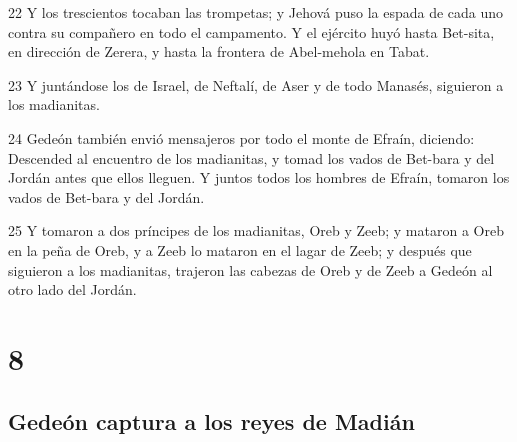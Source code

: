 \par 22 Y los trescientos tocaban las trompetas; y Jehová puso la espada de cada uno contra su compañero en todo el campamento. Y el ejército huyó hasta Bet-sita, en dirección de Zerera, y hasta la frontera de Abel-mehola en Tabat.
\par 23 Y juntándose los de Israel, de Neftalí, de Aser y de todo Manasés, siguieron a los madianitas.
\par 24 Gedeón también envió mensajeros por todo el monte de Efraín, diciendo: Descended al encuentro de los madianitas, y tomad los vados de Bet-bara y del Jordán antes que ellos lleguen. Y juntos todos los hombres de Efraín, tomaron los vados de Bet-bara y del Jordán.
\par 25 Y tomaron a dos príncipes de los madianitas, Oreb y Zeeb; y mataron a Oreb en la peña de Oreb, y a Zeeb lo mataron en el lagar de Zeeb; y después que siguieron a los madianitas, trajeron las cabezas de Oreb y de Zeeb a Gedeón al otro lado del Jordán.

\chapter{8}

\section*{Gedeón captura a los reyes de Madián}

